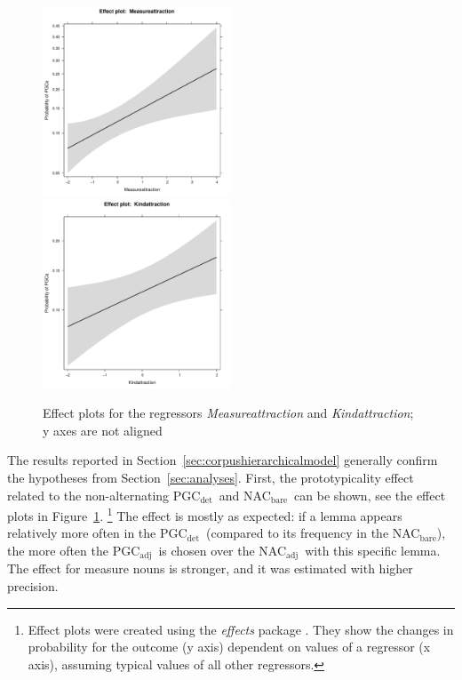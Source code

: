 \documentclass[USenglish]{article}
\newcommand{\Sub}[1]{\ensuremath{\mathrm{_{#1}}}}
\newcommand{\NACb}{NAC\Sub{bare}}
\newcommand{\NACa}{NAC\Sub{adj}}
\newcommand{\PGCd}{PGC\Sub{det}}
\newcommand{\PGCa}{PGC\Sub{adj}}
\begin{document}

\begin{figure}[h!]
  \centering
  \includegraphics[width=0.5\textwidth]{../R/output/corpus_Measureattraction}~\includegraphics[width=0.5\textwidth]{../R/output/corpus_Kindattraction}
  \caption{Effect plots for the regressors \textit{Measureattraction} and \textit{Kindattraction}; y axes are not aligned}
  \label{fig:eff:attraction}
\end{figure}

The results reported in Section~\ref{sec:corpushierarchicalmodel} generally confirm the hypotheses from Section~\ref{sec:analyses}.
First, the prototypicality effect related to the non-alternating \PGCd\ and \NACb\ can be shown, see the effect plots in Figure~\ref{fig:eff:attraction}.%
\footnote{Effect plots were created using the \textit{effects} package \citep{Fox2003}.
They show the changes in probability for the outcome (y axis) dependent on values of a regressor (x axis), assuming typical values of all other regressors.}
The effect is mostly as expected:
if a lemma appears relatively more often in the \PGCd\ (compared to its frequency in the \NACb), the more often the \PGCa\ is chosen over the \NACa\ with this specific lemma.
The effect for measure nouns is stronger, and it was estimated with higher precision.
\end{document}
